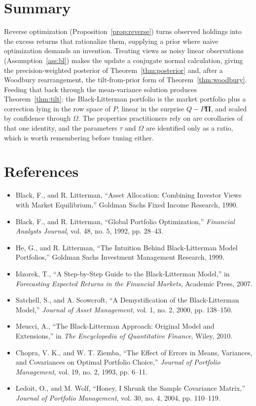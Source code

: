\documentclass[11pt]{article}
\theoremstyle{remark}
\theoremstyle{definition}
\begin{document}
\section{Summary}
\label{sec:summary}

Reverse optimization (Proposition~\ref{prop:reverse}) turns observed holdings into the excess returns that rationalize them, supplying a prior where naive optimization demands an invention. Treating views as noisy linear observations (Assumption~\ref{ass:bl}) makes the update a conjugate normal calculation, giving the precision-weighted posterior of Theorem~\ref{thm:posterior} and, after a Woodbury rearrangement, the tilt-from-prior form of Theorem~\ref{thm:woodbury}. Feeding that back through the mean-variance solution produces Theorem~\ref{thm:tilt}: the Black-Litterman portfolio is the market portfolio plus a correction lying in the row space of $P$, linear in the surprise $Q - P\boldsymbol\Pi$, and scaled by confidence through $\Omega$. The properties practitioners rely on are corollaries of that one identity, and the parameters $\tau$ and $\Omega$ are identified only as a ratio, which is worth remembering before tuning either.

\section*{References}

\begin{itemize}
    \item Black, F., and R. Litterman, ``Asset Allocation: Combining Investor Views with Market Equilibrium,'' Goldman Sachs Fixed Income Research, 1990.
    \item Black, F., and R. Litterman, ``Global Portfolio Optimization,'' \emph{Financial Analysts Journal}, vol. 48, no. 5, 1992, pp. 28--43.
    \item He, G., and R. Litterman, ``The Intuition Behind Black-Litterman Model Portfolios,'' Goldman Sachs Investment Management Research, 1999.
    \item Idzorek, T., ``A Step-by-Step Guide to the Black-Litterman Model,'' in \emph{Forecasting Expected Returns in the Financial Markets}, Academic Press, 2007.
    \item Satchell, S., and A. Scowcroft, ``A Demystification of the Black-Litterman Model,'' \emph{Journal of Asset Management}, vol. 1, no. 2, 2000, pp. 138--150.
    \item Meucci, A., ``The Black-Litterman Approach: Original Model and Extensions,'' in \emph{The Encyclopedia of Quantitative Finance}, Wiley, 2010.
    \item Chopra, V. K., and W. T. Ziemba, ``The Effect of Errors in Means, Variances, and Covariances on Optimal Portfolio Choice,'' \emph{Journal of Portfolio Management}, vol. 19, no. 2, 1993, pp. 6--11.
    \item Ledoit, O., and M. Wolf, ``Honey, I Shrunk the Sample Covariance Matrix,'' \emph{Journal of Portfolio Management}, vol. 30, no. 4, 2004, pp. 110--119.
\end{itemize}
\end{document}
